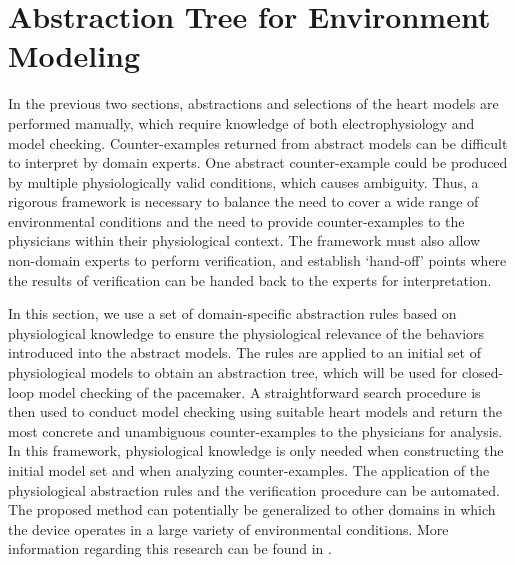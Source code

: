\section{Abstraction Tree for Environment Modeling}
In the previous two sections, abstractions and selections of the heart models are performed manually, which require knowledge of both electrophysiology and model checking. 
Counter-examples returned from abstract models can be difficult to interpret by domain experts.
One abstract counter-example could be produced by multiple physiologically valid conditions, which causes ambiguity.
Thus, a rigorous framework is necessary to balance the need to cover a wide range of environmental conditions and the need to provide counter-examples to the physicians within their physiological context. The framework must also allow non-domain experts to perform verification, and establish `hand-off' points where the results of verification can be handed back 
to the experts for interpretation.

In this section, we use a set of domain-specific abstraction rules based on physiological knowledge to ensure the physiological relevance of the behaviors introduced into the abstract models.
The rules are applied to an initial set of physiological models to obtain an abstraction tree, which will be used for closed-loop model checking of the pacemaker. 
A straightforward search procedure is then used to conduct model checking using suitable heart models and return the most concrete and unambiguous counter-examples to the physicians for analysis.
In this framework, physiological knowledge is only needed when constructing the initial model set and when analyzing counter-examples. 
The application of the physiological abstraction rules and the verification procedure can be automated.
The proposed method can potentially be generalized to other domains in which the device operates in a large variety of environmental conditions. More information regarding this research can be found in \cite{regar_tech}.
